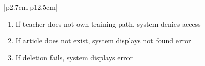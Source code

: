 \begin{table}[H]
\begin{tabular}{|p{2.7cm}|p{12.5cm}|}
\begin{minipage}[t]{\linewidth}
\begin{enumerate}[topsep=0pt,itemsep=1pt,parsep=0pt,partopsep=0pt]
                                          \item If teacher does not own training path, system denies access
                                          \item If article does not exist, system displays not found error
                                          \item If deletion fails, system displays error
                                      \end{enumerate}
                                  \end{minipage} \\
        \hline
    \end{tabular}
    \label{tab:teacher-delete-article}
\end{table}

